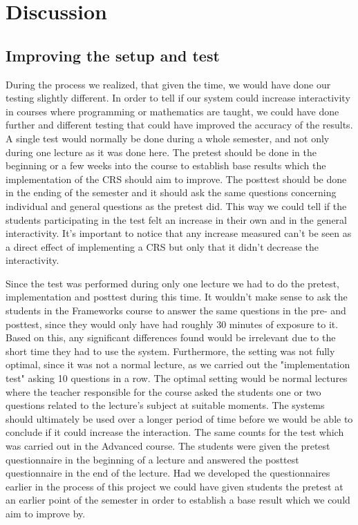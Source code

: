 \section{Discussion}

\subsection{Improving the setup and test}
During the process we realized, that given the time, we would have done our testing slightly different. In order to tell if our system could increase interactivity in courses where programming or mathematics are taught, we could have done further and different testing that could have improved the accuracy of the results. A single test would normally be done during a whole semester, and not only during one lecture as it was done here. The pretest should be done in the beginning or a few weeks into the course to establish base results which the implementation of the CRS should aim to improve. The posttest should be done in the ending of the semester and it should ask the same questions concerning individual and general questions as the pretest did. This way we could tell if the students participating in the test felt an increase in their own and in the general interactivity. It's important to notice that any increase measured can't be seen as a direct effect of implementing a CRS but only that it didn't decrease the interactivity. 

Since the test was performed during only one lecture we had to do the pretest, implementation and posttest during this time. It wouldn't make sense to ask the students in the Frameworks course to answer the same questions in the pre- and posttest, since they would only have had roughly 30 minutes of exposure to it. Based on this, any significant differences found would be irrelevant due to the short time they had to use the system. Furthermore, the setting was not fully optimal, since it was not a normal lecture, as we carried out the "implementation test" asking 10 questions in a row. The optimal setting would be normal lectures where the teacher responsible for the course asked the students one or two questions related to the lecture's subject at suitable moments. The systems should ultimately be used over a longer period of time before we would be able to conclude if it could increase the interaction. The same counts for the test which was carried out in the Advanced course. The students were given the pretest questionnaire in the beginning of a lecture and answered the posttest questionnaire in the end of the lecture. Had we developed the questionnaires earlier in the process of this project we could have given students the pretest at an earlier point of the semester in order to establish a base result which we could aim to improve by.



